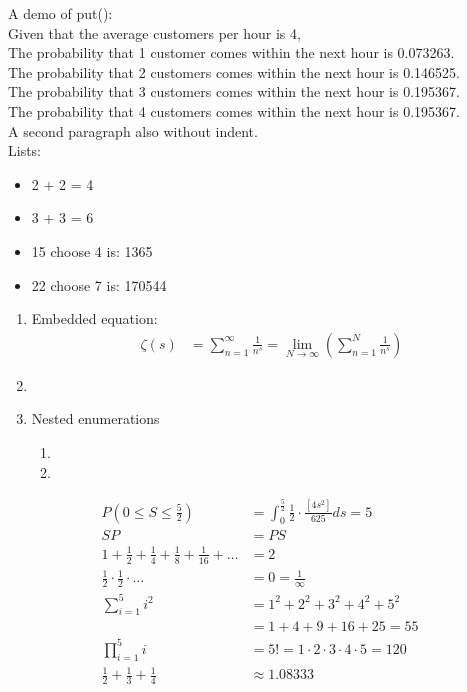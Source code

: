 \documentclass[11pt]{article}
\begin{document}
    
        \noindent
        A demo of put(): \\
        Given that the average customers per hour is 4, \\
        The probability that 1 customer comes within the next hour is 0.073263. \\
        The probability that 2 customers comes within the next hour is 0.146525. \\
        The probability that 3 customers comes within the next hour is 0.195367. \\
        The probability that 4 customers comes within the next hour is 0.195367. \\
        
        \noindent
        A second paragraph also without indent. \\
    
    Lists:
    \begin{itemize}
        \item  2 + 2 = 4
        \item  3 + 3 = 6
        \item  15 choose 4 is: 1365

        \item  22 choose 7 is: 170544
    \end{itemize}
    
    \begin{enumerate}
        \item  \lipsum[1]
            Embedded equation:
            \begin{align*}\zeta(s) &= \sum_{n = 1}^{\infty} \frac{1}{{n^s}} = \lim_{N \to \infty} \left(\sum_{n = 1}^{N} \frac{1}{{n^s}}\right)
            \end{align*}
            
        \item  \lipsum[2]
        \item  Nested enumerations
        \begin{enumerate}%
            \item  \lipsum[3]
            \item  \lipsum[4]
        \end{enumerate}
    \end{enumerate}
    
    \begin{align*}
        P(0 \leq S \leq \frac{5}{2}) &= \int_{0}^{\frac{5}{2}} \frac{1}{2} \cdot \frac{[4s^2]}{625} ds = 5 \\
        SP &= PS \\
        1 + \frac{1}{2}+\frac{1}{4}+\frac{1}{8}+\frac{1}{16} + \hdots &= 2 \\
        \frac{1}{2} \cdot \frac{1}{2} \cdot \hdots &= 0 = \frac{1}{\infty} \\
        \sum_{i = 1}^{5} i^2 &= 1^2+2^2+3^2+4^2+5^2 \\
        &= 1+4+9+16+25 = 55 \\
        \prod_{i = 1}^{5} i &= 5! = 1 \cdot 2 \cdot 3 \cdot 4 \cdot 5 = 120 \\
        \frac{1}{2} + \frac{1}{3} + \frac{1}{4} &\approx 1.08333
    \end{align*}
    
\end{document}
